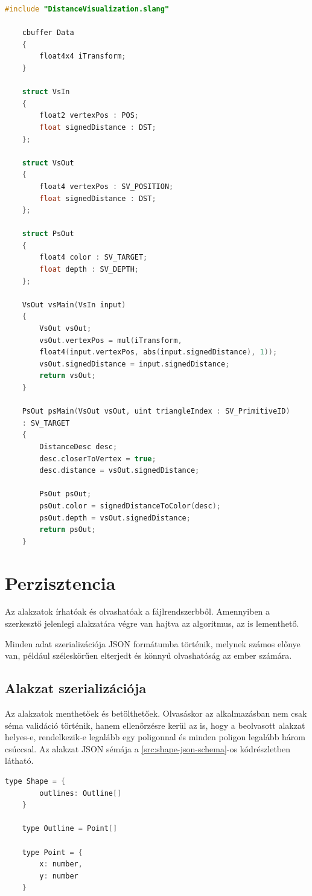 \begin{lstlisting}[language=c]
	#include "DistanceVisualization.slang"

	cbuffer Data
	{
		float4x4 iTransform;
	}

	struct VsIn
	{
		float2 vertexPos : POS;
		float signedDistance : DST;
	};

	struct VsOut
	{
		float4 vertexPos : SV_POSITION;
		float signedDistance : DST;
	};

	struct PsOut
	{
		float4 color : SV_TARGET;
		float depth : SV_DEPTH;
	};

	VsOut vsMain(VsIn input)
	{
		VsOut vsOut;
		vsOut.vertexPos = mul(iTransform,
		float4(input.vertexPos, abs(input.signedDistance), 1));
		vsOut.signedDistance = input.signedDistance;
		return vsOut;
	}

	PsOut psMain(VsOut vsOut, uint triangleIndex : SV_PrimitiveID)
	: SV_TARGET
	{
		DistanceDesc desc;
		desc.closerToVertex = true;
		desc.distance = vsOut.signedDistance;

		PsOut psOut;
		psOut.color = signedDistanceToColor(desc);
		psOut.depth = vsOut.signedDistance;
		return psOut;
	}
\end{lstlisting}


\section{Perzisztencia}

Az alakzatok írhatóak és olvashatóak a fájlrendszerbből. Amennyiben a szerkesztő jelenlegi alakzatára végre van hajtva az algoritmus, az is lementhető.

Minden adat szerializációja JSON formátumba történik, melynek számos előnye van, például széleskörűen elterjedt és könnyű olvashatóság az ember számára.

\subsection{Alakzat szerializációja}

Az alakzatok menthetőek és betölthetőek. Olvasáskor az alkalmazásban nem csak séma validáció történik, hanem ellenőrzésre kerül az is, hogy a beolvasott alakzat helyes-e, rendelkezik-e legalább egy poligonnal és minden poligon legalább három csúccsal. Az alakzat JSON sémája a \ref{src:shape-json-schema}-os kódrészletben látható.

\begin{lstlisting}[language=C]
	type Shape = {
		outlines: Outline[]
	}

	type Outline = Point[]

	type Point = {
		x: number,
		y: number
	}
\end{lstlisting}



